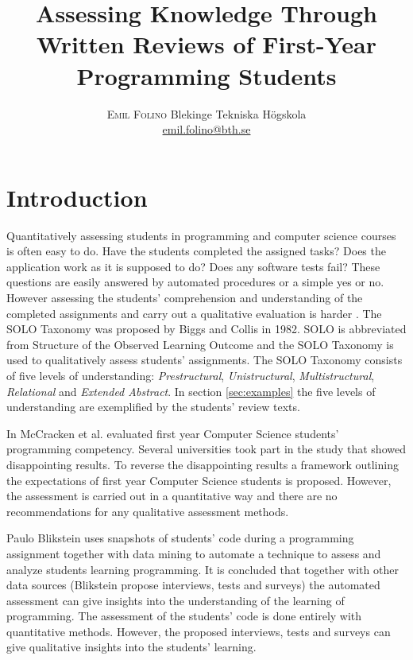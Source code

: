 \documentclass[twoside,twocolumn,a4paper,11pt,english]{article}
\title{Assessing Knowledge Through Written Reviews of First-Year Programming Students} %
\author{%
\textsc{Emil Folino} %
\normalsize Blekinge Tekniska Högskola \\ %
\normalsize \href{mailto:emil.folino@bth.se}{emil.folino@bth.se} %
}
\date{} %
\begin{document}
\maketitle


\section{Introduction}
Quantitatively assessing students in programming and computer science courses is often easy to do. Have the students completed the assigned tasks? Does the application work as it is supposed to do? Does any software tests fail? These questions are easily answered by automated procedures or a simple yes or no. However assessing the students' comprehension and understanding of the completed assignments and carry out a qualitative evaluation is harder \cite{biggs1982evaluation}. The SOLO Taxonomy was proposed by Biggs and Collis in 1982. SOLO is abbreviated from Structure of the Observed Learning Outcome and the SOLO Taxonomy is used to qualitatively assess students' assignments. The SOLO Taxonomy consists of five levels of understanding: \textit{Prestructural}, \textit{Unistructural}, \textit{Multistructural}, \textit{Relational} and \textit{Extended Abstract}. In section \ref{sec:examples} the five levels of understanding are exemplified by the students' review texts.

In \cite{mccracken2001multi} McCracken et al. evaluated first year Computer Science students' programming competency. Several universities took part in the study that showed disappointing results. To reverse the disappointing results a framework outlining the expectations of first year Computer Science students is proposed. However, the assessment is carried out in a quantitative way and there are no recommendations for any qualitative assessment methods.

Paulo Blikstein \cite{Blikstein} uses snapshots of students' code during a programming assignment together with data mining to automate a technique to assess and analyze students learning programming. It is concluded that together with other data sources (Blikstein propose interviews, tests and surveys) the automated assessment can give insights into the understanding of the learning of programming. The assessment of the students' code is done entirely with quantitative methods. However, the proposed interviews, tests and surveys can give qualitative insights into the students' learning.
\end{document}
